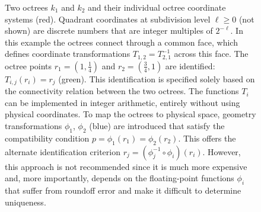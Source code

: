 \documentclass[a4paper,12pt]{article}
\newcommand{\figlab}[1]{\label{fig:#1}}
\begin{document}
\begin{figure}[b!]
\begin{tikzpicture}
\end{tikzpicture}
\caption{%
Two octrees $k_1$ and $k_2$ and their individual octree coordinate systems
(red).  Quadrant coordinates at subdivision level $\ell \ge 0$ (not shown) are
discrete numbers that are integer multiples of $2^{-\ell}$.  In this example
the octrees connect through a common face, which defines coordinate
transformations $T_{1,2} = T_{2,1}^{-1}$ across this face.  The octree points
$r_1 = (1, \frac14)$ and $r_2 = (\frac34, 1)$ are identified: $T_{i,j}(r_i) =
r_j$ (green).  This identification is specified solely based on the
connectivity relation between the two octrees.  The functions $T_i$ can be
implemented in integer arithmetic, entirely without using physical coordinates.
To map the octrees to physical space, geometry transformations $\phi_1$,
$\phi_2$ (blue) are introduced that satisfy the compatibility condition $p =
\phi_1 (r_1) = \phi_2 (r_2)$.  This offers the alternate identification
criterion $r_j = (\phi_j ^{-1} \circ \phi_i) (r_i)$.  However, this approach is
not recommended since it is much more expensive and, more importantly, depends
on the floating-point functions $\phi_i$ that suffer from roundoff error and
make it difficult to determine uniqueness.
}
\figlab{octreemap}
\end{figure}
\end{document}
